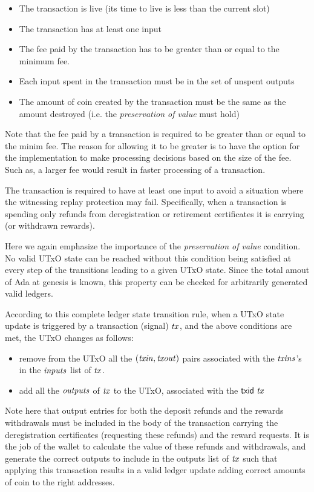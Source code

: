 \documentclass[11pt,a4paper,dvipsnames]{article}
\theoremstyle{definition}
\theoremstyle{definition}
\begin{document}
\begin{itemize}
\item The transaction is live (its time to live is less than the current slot)
\item The transaction has at least one input
\item The fee paid by the transaction has to be greater than or equal to the
minimum fee.
\item Each input spent in the transaction must be in the set of unspent
  outputs
\item The amount of coin created by the transaction must be the same as
the amount destroyed (i.e. the \textit{preservation of value} must hold)
\end{itemize}

Note that the fee paid by a transaction is required to be greater than or
equal to the minim fee. The reason for allowing it to be greater is to have
the option for the implementation to make processing decisions based on the
size of the fee. Such as, a larger fee would result in faster processing of
a transaction.

The transaction is required to have at least one input to avoid a situation
where the witnessing replay protection may fail. Specifically, when a transaction is
spending only refunds from deregistration or retirement certificates it is
carrying (or withdrawn rewards).

Here we again emphasize the importance of the \textit{preservation of value}
condition. No valid UTxO state can be reached without this condition
being satisfied at every step of the transitions leading to a given UTxO state.
Since the total amout of Ada at genesis is known, this property can be
checked for arbitrarily generated valid ledgers.

According to this complete ledger state transition rule, when a UTxO state update
is triggered by a
transaction (signal) $\mathit{tx}$, and the above conditions are met, the UTxO
changes as follows:

\begin{itemize}
\item remove from the UTxO all the $(\mathit{txin}, \mathit{txout})$ pairs
associated with the $\mathit{txins}$'s in the $\mathit{inputs}$ list of $\mathit{tx}$.
\item add all the $\mathit{outputs}$ of $\mathit{tx}$ to the
UTxO, associated with the $\mathsf{txid}~\mathit{tx}$
\end{itemize}

Note here that output entries for both the deposit refunds and the rewards
withdrawals must be included in the body of the transaction
carrying the deregistration certificates (requesting these refunds) and the
reward requests. It is the job
of the wallet to calculate the value of these refunds and withdrawals, and
generate the correct outputs to include in the outputs list of $\mathit{tx}$ such
that applying this transaction results in a
valid ledger update adding correct amounts of coin to the right addresses.
\end{document}
